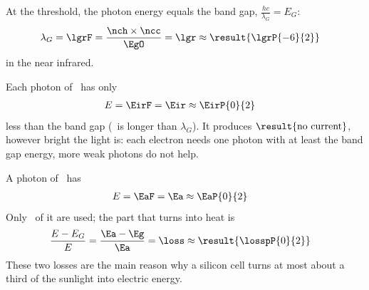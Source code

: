 \begin{abcliste}
\abc At the threshold, the photon energy equals the band gap, $\frac{hc}{\lambda_G} = E_G$:
\begin{align}
 \lambda_G &= \lgrF = \frac{\nch\times\ncc}{\EgO} = \lgr \approx \result{\lgrP{-6}{2}}
\end{align}
in the near infrared.

\abc Each photon of \lirO\ has only
\begin{align}
 E &= \EirF = \Eir \approx \EirP{0}{2}
\end{align}
less than the band gap (\lirO\ is longer than $\lambda_G$). It produces $\result{\text{no current}}$, however bright the light is: each electron needs one photon with at least the band gap energy, more weak photons do not help.

\abc A photon of \laO\ has
\begin{align}
 E &= \EaF = \Ea \approx \EaP{0}{2}
\end{align}
Only \EgO\ of it are used; the part that turns into heat is
\begin{align}
 \frac{E-E_G}{E} &= \frac{\Ea-\Eg}{\Ea} = \loss \approx \result{\losspP{0}{2}}
\end{align}
These two losses are the main reason why a silicon cell turns at most about a third of the sunlight into electric energy.
\end{abcliste}
